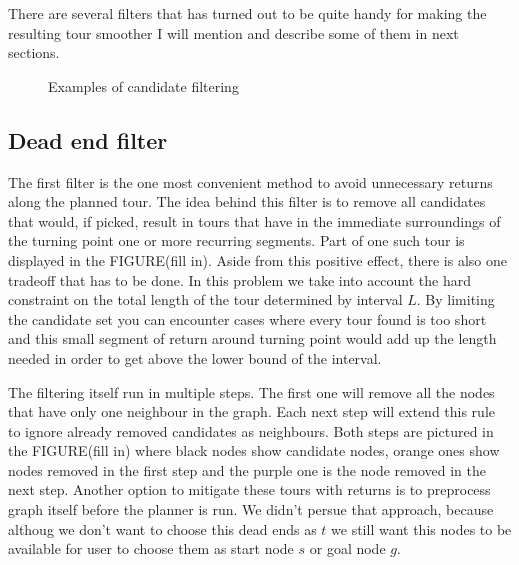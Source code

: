 \documentclass{ctuthesis}
\begin{document}
There are several filters that has turned out to be quite handy for making the resulting tour smoother I will mention and describe some of them in next sections.
\begin{figure}[!tbp]
  \centering
  \hfill
  \caption{Examples of candidate filtering}
\end{figure}

\subsection{Dead end filter}
The first filter is the one most convenient method to avoid unnecessary returns along the planned tour. The idea behind this filter is to remove all candidates that would, if picked, result in tours that have in the immediate surroundings of the turning point one or more recurring segments. Part of one such tour is displayed in the FIGURE(fill in). Aside from this positive effect, there is also one tradeoff that has to be done. In this problem we take into account the hard constraint on the total length of the tour determined by interval \(L\). By limiting the candidate set you can encounter cases where every tour found is too short and this small segment of return around turning point would add up the length needed in order to get above the lower bound of the interval. \par
The filtering itself run in multiple steps. The first one will remove all the nodes that have only one neighbour in the graph. Each next step will extend this rule to ignore already removed candidates as neighbours. Both steps are pictured in the FIGURE(fill in) where black nodes show candidate nodes, orange ones show nodes removed in the first step and the purple one is the node removed in the next step. Another option to mitigate these tours with returns is to preprocess graph itself before the planner is run. We didn't persue that approach, because althoug we don't want to choose this dead ends as \(t\) we still want this nodes to be available for user to choose them as start node \(s\) or goal node \(g\).
\end{document}
